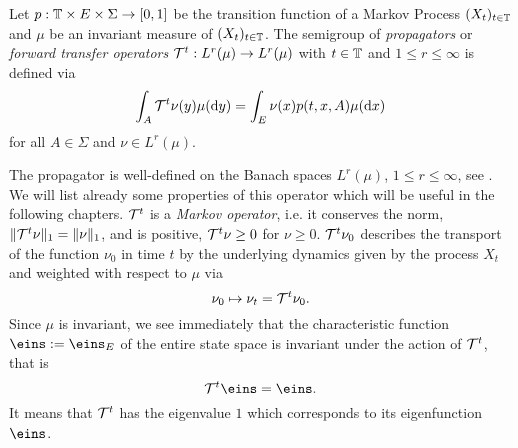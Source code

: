 \begin{defi}
Let $p: \mathbb{T} \times E \times \Sigma \rightarrow [0,1]$ be the transition function of a Markov Process $(X_t)_{t\in\mathbb{T}}$ and $\mu$ be an invariant measure of $(X_t)_{t\in\mathbb{T}}$.
The semigroup of \textit{propagators} or \textit{forward transfer operators} $\mathcal{T}^t : L^r (\mu) \rightarrow L^r (\mu)$ with $t \in \mathbb{T}$ and $1\leq r \leq \infty$ is defined via
\begin{equation}
\label{eq:forward}
\int_A \mathcal{T}^t \nu(y) \mu(\mathop{}\!\mathrm{d} y) = \int_E \nu(x)p(t,x,A) \mu(\mathop{}\!\mathrm{d} x)
\end{equation}
for all $A \in \Sigma$ and $\nu \in L^r(\mu)$.
\end{defi}
The propagator is well-defined on the Banach spaces $L^r(\mu)$, $1 \leq r \leq \infty$, see \cite{huisinga2001metastability}.
We will list already some properties of this operator which will be useful in the following chapters.
$\mathcal{T}^t$ is a \textit{Markov operator}, i.e. it conserves the norm, $\Vert \mathcal{T}^t\nu \Vert_1 = \Vert \nu \Vert_1$, and is positive, $\mathcal{T}^t \nu \geq 0$ for $\nu \geq 0$.
$\mathcal{T}^t \nu_0$ describes the transport of the function $\nu_0$ in time $t$ by the underlying dynamics given by the process $X_t$ and weighted with respect to $\mu$ via
\begin{equation*}
\nu_0 \mapsto \nu_t = \mathcal{T}^t \nu_0.
\end{equation*}
Since $\mu$ is invariant, we see immediately that the characteristic function $\eins := \eins_E$ of the entire state space is invariant under the action of $\mathcal{T}^t$, that is 
\begin{equation*}
\Tcal^t \eins = \eins.
\end{equation*}
It means that $\mathcal{T}^t$ has the eigenvalue $1$ which corresponds to its eigenfunction $\eins$.


